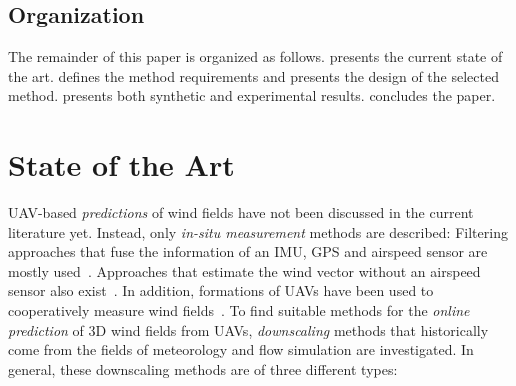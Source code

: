 \documentclass[twocolumn,letterpaper]{IEEEAerospaceCLS}
\begin{document}
\subsection{Organization}
\label{sec:PL_Intro_Contributions}

The remainder of this paper is organized as follows.  presents the current state of the art.  defines the method requirements and presents the design of the selected method.  presents both synthetic and experimental results.  concludes the paper.

\section{State of the Art}
\label{sec:PL_WindPred_StateOfTheArt}

UAV-based \emph{predictions} of wind fields have not been discussed in the current literature yet. Instead, only \emph{in-situ measurement} methods are described: Filtering approaches that fuse the information of an \ac{IMU}, \ac{GPS} and airspeed sensor are mostly used~\cite{Petrich2011WindEstimation,Langelaan2011WindEstimation}. Approaches that estimate the wind vector without an airspeed sensor also exist~\cite{palanthandalam2008WindEstimationWithoutAirspeedSensor}. In addition, formations of UAVs have been used to cooperatively measure wind fields~\cite{Larrabee2014WindEstimationCooperative}. To find suitable methods for the \emph{online prediction} of 3D wind fields from UAVs, \emph{downscaling} methods that historically come from the fields of meteorology and flow simulation are investigated. In general, these downscaling methods are of three different types:
\end{document}

